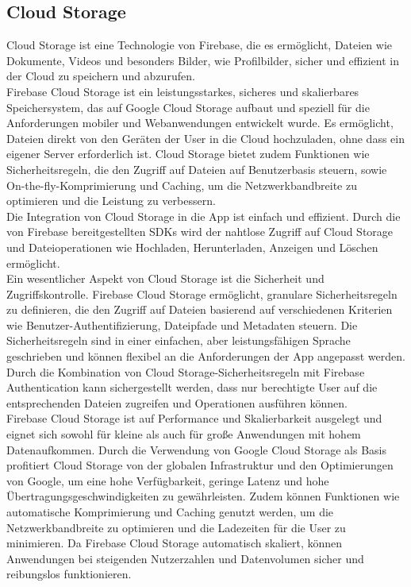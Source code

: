
\subsection{Cloud Storage}

Cloud Storage\cite{firebase_storage} ist eine Technologie von Firebase, die es ermöglicht, Dateien wie Dokumente, Videos und besonders Bilder, wie Profilbilder, sicher und effizient in der Cloud zu speichern und abzurufen.
\\
Firebase Cloud Storage ist ein leistungsstarkes, sicheres und skalierbares Speichersystem, das auf Google Cloud Storage aufbaut und speziell für die Anforderungen mobiler und Webanwendungen entwickelt wurde. Es ermöglicht, Dateien direkt von den Geräten der User in die Cloud hochzuladen, ohne dass ein eigener Server erforderlich ist. Cloud Storage bietet zudem Funktionen wie Sicherheitsregeln, die den Zugriff auf Dateien auf Benutzerbasis steuern, sowie On-the-fly-Komprimierung und Caching, um die Netzwerkbandbreite zu optimieren und die Leistung zu verbessern.
\\
Die Integration von Cloud Storage in die App ist einfach und effizient. Durch die von Firebase bereitgestellten SDKs wird der nahtlose Zugriff auf Cloud Storage und Dateioperationen wie Hochladen, Herunterladen, Anzeigen und Löschen ermöglicht.
\\
Ein wesentlicher Aspekt von Cloud Storage ist die Sicherheit und Zugriffskontrolle. Firebase Cloud Storage ermöglicht, granulare Sicherheitsregeln zu definieren, die den Zugriff auf Dateien basierend auf verschiedenen Kriterien wie Benutzer-Authentifizierung, Dateipfade und Metadaten steuern. Die Sicherheitsregeln sind in einer einfachen, aber leistungsfähigen Sprache geschrieben und können flexibel an die Anforderungen der App angepasst werden. Durch die Kombination von Cloud Storage-Sicherheitsregeln mit Firebase Authentication kann sichergestellt werden, dass nur berechtigte User auf die entsprechenden Dateien zugreifen und Operationen ausführen können.
\\
Firebase Cloud Storage ist auf Performance und Skalierbarkeit ausgelegt und eignet sich sowohl für kleine als auch für große Anwendungen mit hohem Datenaufkommen. Durch die Verwendung von Google Cloud Storage als Basis profitiert Cloud Storage von der globalen Infrastruktur und den Optimierungen von Google, um eine hohe Verfügbarkeit, geringe Latenz und hohe Übertragungsgeschwindigkeiten zu gewährleisten. Zudem können Funktionen wie automatische Komprimierung und Caching genutzt werden, um die Netzwerkbandbreite zu optimieren und die Ladezeiten für die User zu minimieren. Da Firebase Cloud Storage automatisch skaliert, können Anwendungen bei steigenden Nutzerzahlen und Datenvolumen sicher und reibungslos funktionieren.

